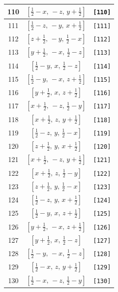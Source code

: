 \documentclass[fleqn,8pt]{jsarticle}
\begin{document}
\begin{longtable}{ccc}
110 & $\left[ \frac{1}{2} - x,\, - z,\, y + \frac{1}{2} \right]$ & {\tt [110]} \\ \hline
111 & $\left[ \frac{1}{2} - z,\, - y,\, x + \frac{1}{2} \right]$ & {\tt [111]} \\ \hline
112 & $\left[ z + \frac{1}{2},\, - y,\, \frac{1}{2} - x \right]$ & {\tt [112]} \\ \hline
113 & $\left[ y + \frac{1}{2},\, - x,\, \frac{1}{2} - z \right]$ & {\tt [113]} \\ \hline
114 & $\left[ \frac{1}{2} - y,\, x,\, \frac{1}{2} - z \right]$ & {\tt [114]} \\ \hline
115 & $\left[ \frac{1}{2} - y,\, - x,\, z + \frac{1}{2} \right]$ & {\tt [115]} \\ \hline
116 & $\left[ y + \frac{1}{2},\, x,\, z + \frac{1}{2} \right]$ & {\tt [116]} \\ \hline
117 & $\left[ x + \frac{1}{2},\, - z,\, \frac{1}{2} - y \right]$ & {\tt [117]} \\ \hline
118 & $\left[ x + \frac{1}{2},\, z,\, y + \frac{1}{2} \right]$ & {\tt [118]} \\ \hline
119 & $\left[ \frac{1}{2} - z,\, y,\, \frac{1}{2} - x \right]$ & {\tt [119]} \\ \hline
120 & $\left[ z + \frac{1}{2},\, y,\, x + \frac{1}{2} \right]$ & {\tt [120]} \\ \hline
121 & $\left[ x + \frac{1}{2},\, - z,\, y + \frac{1}{2} \right]$ & {\tt [121]} \\ \hline
122 & $\left[ x + \frac{1}{2},\, z,\, \frac{1}{2} - y \right]$ & {\tt [122]} \\ \hline
123 & $\left[ z + \frac{1}{2},\, y,\, \frac{1}{2} - x \right]$ & {\tt [123]} \\ \hline
124 & $\left[ \frac{1}{2} - z,\, y,\, x + \frac{1}{2} \right]$ & {\tt [124]} \\ \hline
125 & $\left[ \frac{1}{2} - y,\, x,\, z + \frac{1}{2} \right]$ & {\tt [125]} \\ \hline
126 & $\left[ y + \frac{1}{2},\, - x,\, z + \frac{1}{2} \right]$ & {\tt [126]} \\ \hline
127 & $\left[ y + \frac{1}{2},\, x,\, \frac{1}{2} - z \right]$ & {\tt [127]} \\ \hline
128 & $\left[ \frac{1}{2} - y,\, - x,\, \frac{1}{2} - z \right]$ & {\tt [128]} \\ \hline
129 & $\left[ \frac{1}{2} - x,\, z,\, y + \frac{1}{2} \right]$ & {\tt [129]} \\ \hline
130 & $\left[ \frac{1}{2} - x,\, - z,\, \frac{1}{2} - y \right]$ & {\tt [130]} \\ \hline

\end{longtable}
\end{document}
